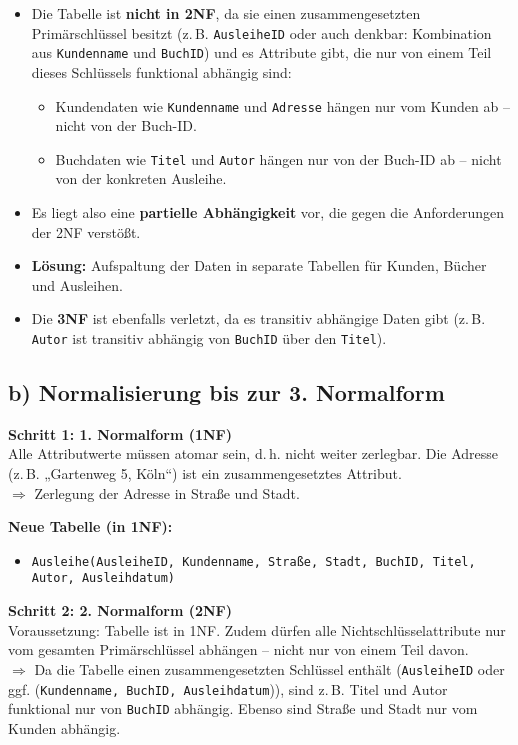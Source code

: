\documentclass{article}
\begin{document}
\begin{enumerate}
\begin{itemize}
			\item Die Tabelle ist  \textbf{nicht in 2NF}, da sie einen zusammengesetzten Primärschlüssel besitzt (z.\,B. \texttt{AusleiheID} oder auch denkbar: Kombination aus \texttt{Kundenname} und \texttt{BuchID}) und es Attribute gibt, die nur von einem Teil dieses Schlüssels funktional abhängig sind:
			\begin{itemize}
				\item Kundendaten wie \texttt{Kundenname} und \texttt{Adresse} hängen nur vom Kunden ab – nicht von der Buch-ID.
				\item Buchdaten wie \texttt{Titel} und \texttt{Autor} hängen nur von der Buch-ID ab – nicht von der konkreten Ausleihe.
			\end{itemize}
			\item Es liegt also eine \textbf{partielle Abhängigkeit} vor, die gegen die Anforderungen der 2NF verstößt.
			\item \textbf{Lösung:} Aufspaltung der Daten in separate Tabellen für Kunden, Bücher und Ausleihen.
			
			
			\item Die \textbf{3NF} ist ebenfalls verletzt, da es transitiv abhängige Daten gibt (z.\,B. \texttt{Autor} ist transitiv abhängig von \texttt{BuchID} über den \texttt{Titel}).
		\end{itemize}
	\end{enumerate}
	
	
	\subsection*{b) Normalisierung bis zur 3. Normalform}
	
	\textbf{Schritt 1: 1. Normalform (1NF)}\\
	Alle Attributwerte müssen atomar sein, d.\,h. nicht weiter zerlegbar. Die Adresse (z.\,B. „Gartenweg 5, Köln“) ist ein zusammengesetztes Attribut.\\
	$\Rightarrow$ Zerlegung der Adresse in Straße und Stadt.
	
	\textbf{Neue Tabelle (in 1NF):}
	\begin{itemize}
		\item \texttt{Ausleihe(AusleiheID, Kundenname, Straße, Stadt, BuchID, Titel, Autor, Ausleihdatum)}
	\end{itemize}
	
	\vspace{1em}
	
	\textbf{Schritt 2: 2. Normalform (2NF)}\\
	Voraussetzung: Tabelle ist in 1NF. Zudem dürfen alle Nichtschlüsselattribute nur vom gesamten Primärschlüssel abhängen – nicht nur von einem Teil davon.\\
	$\Rightarrow$ Da die Tabelle einen zusammengesetzten Schlüssel enthält (\texttt{AusleiheID} oder ggf. (\texttt{Kundenname, BuchID, Ausleihdatum})), sind z.\,B. Titel und Autor funktional nur von \texttt{BuchID} abhängig. Ebenso sind Straße und Stadt nur vom Kunden abhängig.
	
\end{document}
